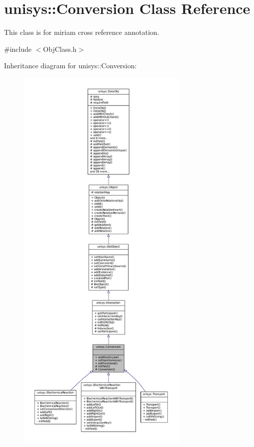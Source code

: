 \hypertarget{classunisys_1_1Conversion}{\section{unisys\-:\-:Conversion Class Reference}
\label{classunisys_1_1Conversion}
}


This class is for miriam cross reference annotation.  




{\ttfamily \#include $<$Obj\-Class.\-h$>$}



Inheritance diagram for unisys\-:\-:Conversion\-:
\nopagebreak
\begin{figure}[H]
\begin{center}
\leavevmode
\includegraphics[height=550pt]{classunisys_1_1Conversion__inherit__graph}
\end{center}
\end{figure}


